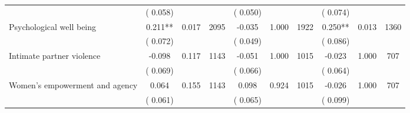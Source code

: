 \begin{tabular}{l*{9}{c}}
                               &        (       0.058) & &                                                                &       (       0.050) & &                                                         &       (       0.074) & & \\ 
 Psychological well being                &              0.211**        &        0.017 & 2095        &             -0.035 &        1.000 & 1922               &        0.250** &        0.013 & 1360       \\ 
                               &        (       0.072) & &                                                                &       (       0.049) & &                                                         &       (       0.086) & & \\ 
 Intimate partner violence                &             -0.098        &        0.117 & 1143        &             -0.051 &        1.000 & 1015               &       -0.023 &        1.000 & 707       \\ 
                               &        (       0.069) & &                                                                &       (       0.066) & &                                                         &       (       0.064) & & \\ 
 Women's empowerment and agency                &              0.064        &        0.155 & 1143        &              0.098 &        0.924 & 1015               &       -0.026 &        1.000 & 707      \\ 
                               &        (       0.061) & &                                                                &       (       0.065) & &                                                         &       (       0.099) & & \\ 
\hline \end{tabular}                                                                                                                                                      